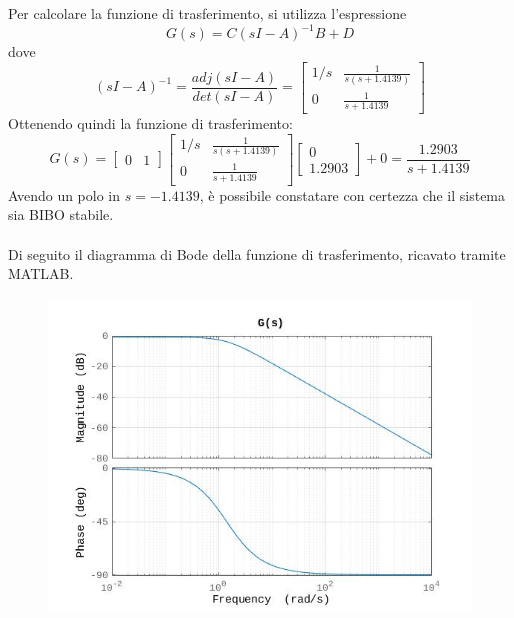 \documentclass[a4paper,12pt,italian]{article}
\begin{document}
Per calcolare la funzione di trasferimento, si utilizza l'espressione
\begin{equation*}
    G(s) = C(sI - A)^{-1}B + D
\end{equation*}
dove
\begin{equation*}
    (sI - A)^{-1} = \frac{adj(sI - A)}{det(sI - A)} = 
    \begin{bmatrix}
        1/s & \frac{1}{s(s + 1.4139)} \\ 
        0   & \frac{1}{s + 1.4139}
    \end{bmatrix}
\end{equation*}
Ottenendo quindi la funzione di trasferimento:
\begin{equation*}
    G(s) =
    \begin{bmatrix}0 & 1 \end{bmatrix}
    \begin{bmatrix}
        1/s & \frac{1}{s(s+1.4139)} \\
        0 &\frac{1}{s+1.4139} \end{bmatrix}
    \begin{bmatrix}0 \\ 1.2903 \end{bmatrix}
    + 0 =
    \frac{1.2903}{s + 1.4139}
\end{equation*}
Avendo un polo in $s = -1.4139$, è possibile constatare con certezza che il sistema sia BIBO stabile.\\ \\
Di seguito il diagramma di Bode della funzione di trasferimento, ricavato tramite MATLAB.

\begin{figure}[h!]
    \begin{center}
        \includegraphics[scale=0.55]{img/bode_GG.jpg}
    \end{center}    
\end{figure}
\end{document}
